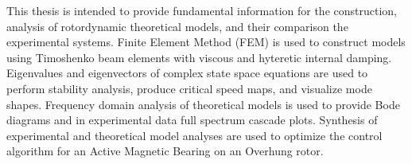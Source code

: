 This thesis is intended to provide fundamental information for the construction, analysis of rotordynamic theoretical models, and their comparison the experimental systems. Finite Element Method (FEM) is used to construct models using Timoshenko beam elements with viscous and hyteretic internal damping. Eigenvalues and eigenvectors of complex state space equations are used to perform stability analysis, produce critical speed maps, and visualize mode shapes. Frequency domain analysis of theoretical models is used to provide Bode diagrams and in experimental data full spectrum cascade plots. Synthesis of experimental and theoretical model analyses are used to optimize the control algorithm for an Active Magnetic Bearing on an Overhung rotor.